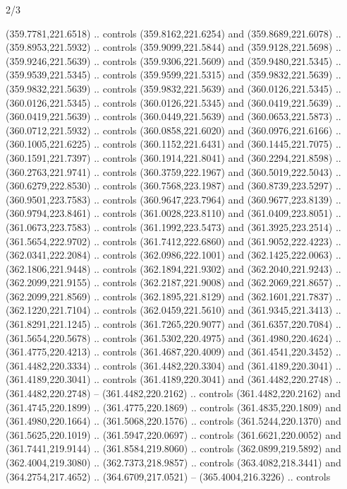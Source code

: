 \begin{flagdescription}{2/3}
\begin{scope}[xshift=0.5\flaglength,yshift=0.5\flagwidth,scale=\flagwidth/495.65]
\begin{scope}[y=0.8pt, x=0.8pt, yscale=-1,shift={(-463.76,-309.78)}]
  (359.7781,221.6518) .. controls (359.8162,221.6254) and (359.8689,221.6078) ..
  (359.8953,221.5932) .. controls (359.9099,221.5844) and (359.9128,221.5698) ..
  (359.9246,221.5639) .. controls (359.9306,221.5609) and (359.9480,221.5345) ..
  (359.9539,221.5345) .. controls (359.9599,221.5315) and (359.9832,221.5639) ..
  (359.9832,221.5639) .. controls (359.9832,221.5639) and (360.0126,221.5345) ..
  (360.0126,221.5345) .. controls (360.0126,221.5345) and (360.0419,221.5639) ..
  (360.0419,221.5639) .. controls (360.0449,221.5639) and (360.0653,221.5873) ..
  (360.0712,221.5932) .. controls (360.0858,221.6020) and (360.0976,221.6166) ..
  (360.1005,221.6225) .. controls (360.1152,221.6431) and (360.1445,221.7075) ..
  (360.1591,221.7397) .. controls (360.1914,221.8041) and (360.2294,221.8598) ..
  (360.2763,221.9741) .. controls (360.3759,222.1967) and (360.5019,222.5043) ..
  (360.6279,222.8530) .. controls (360.7568,223.1987) and (360.8739,223.5297) ..
  (360.9501,223.7583) .. controls (360.9647,223.7964) and (360.9677,223.8139) ..
  (360.9794,223.8461) .. controls (361.0028,223.8110) and (361.0409,223.8051) ..
  (361.0673,223.7583) .. controls (361.1992,223.5473) and (361.3925,223.2514) ..
  (361.5654,222.9702) .. controls (361.7412,222.6860) and (361.9052,222.4223) ..
  (362.0341,222.2084) .. controls (362.0986,222.1001) and (362.1425,222.0063) ..
  (362.1806,221.9448) .. controls (362.1894,221.9302) and (362.2040,221.9243) ..
  (362.2099,221.9155) .. controls (362.2187,221.9008) and (362.2069,221.8657) ..
  (362.2099,221.8569) .. controls (362.1895,221.8129) and (362.1601,221.7837) ..
  (362.1220,221.7104) .. controls (362.0459,221.5610) and (361.9345,221.3413) ..
  (361.8291,221.1245) .. controls (361.7265,220.9077) and (361.6357,220.7084) ..
  (361.5654,220.5678) .. controls (361.5302,220.4975) and (361.4980,220.4624) ..
  (361.4775,220.4213) .. controls (361.4687,220.4009) and (361.4541,220.3452) ..
  (361.4482,220.3334) .. controls (361.4482,220.3304) and (361.4189,220.3041) ..
  (361.4189,220.3041) .. controls (361.4189,220.3041) and (361.4482,220.2748) ..
  (361.4482,220.2748) -- (361.4482,220.2162) .. controls (361.4482,220.2162) and
  (361.4745,220.1899) .. (361.4775,220.1869) .. controls (361.4835,220.1809) and
  (361.4980,220.1664) .. (361.5068,220.1576) .. controls (361.5244,220.1370) and
  (361.5625,220.1019) .. (361.5947,220.0697) .. controls (361.6621,220.0052) and
  (361.7441,219.9144) .. (361.8584,219.8060) .. controls (362.0899,219.5892) and
  (362.4004,219.3080) .. (362.7373,218.9857) .. controls (363.4082,218.3441) and
  (364.2754,217.4652) .. (364.6709,217.0521) -- (365.4004,216.3226) .. controls

\end{scope}
\end{scope}
\end{flagdescription}
